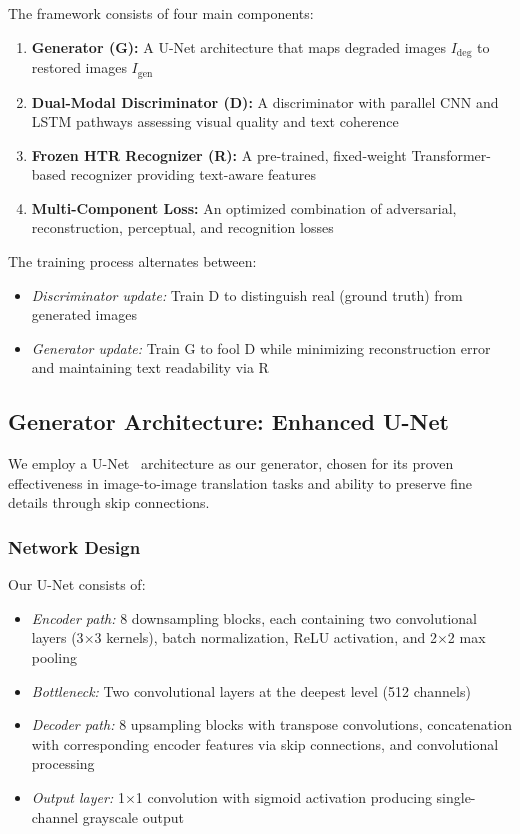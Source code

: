 \documentclass[journal]{IEEEtran}
\begin{document}
The framework consists of four main components:

\begin{enumerate}
    \item \textbf{Generator (G):} A U-Net architecture that maps degraded images $I_{\text{deg}}$ to restored images $I_{\text{gen}}$
    \item \textbf{Dual-Modal Discriminator (D):} A discriminator with parallel CNN and LSTM pathways assessing visual quality and text coherence
    \item \textbf{Frozen HTR Recognizer (R):} A pre-trained, fixed-weight Transformer-based recognizer providing text-aware features
    \item \textbf{Multi-Component Loss:} An optimized combination of adversarial, reconstruction, perceptual, and recognition losses
\end{enumerate}

The training process alternates between:
\begin{itemize}
    \item \textit{Discriminator update:} Train D to distinguish real (ground truth) from generated images
    \item \textit{Generator update:} Train G to fool D while minimizing reconstruction error and maintaining text readability via R
\end{itemize}

\subsection{Generator Architecture: Enhanced U-Net}

We employ a U-Net~\cite{ronneberger2015unet} architecture as our generator, chosen for its proven effectiveness in image-to-image translation tasks and ability to preserve fine details through skip connections.

\subsubsection{Network Design}

Our U-Net consists of:
\begin{itemize}
    \item \textit{Encoder path:} 8 downsampling blocks, each containing two convolutional layers (3$\times$3 kernels), batch normalization, ReLU activation, and 2$\times$2 max pooling
    \item \textit{Bottleneck:} Two convolutional layers at the deepest level (512 channels)
    \item \textit{Decoder path:} 8 upsampling blocks with transpose convolutions, concatenation with corresponding encoder features via skip connections, and convolutional processing
    \item \textit{Output layer:} 1$\times$1 convolution with sigmoid activation producing single-channel grayscale output
\end{itemize}
\end{document}
